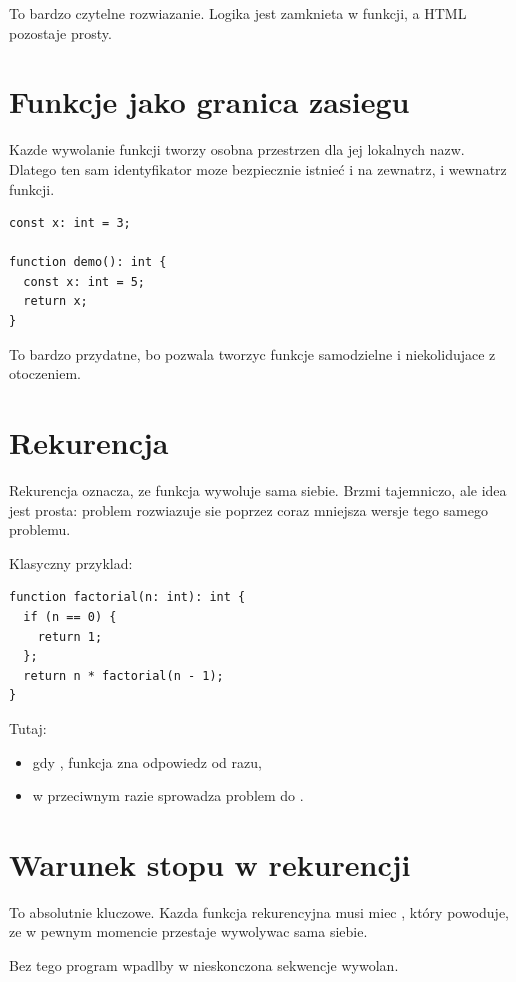 To bardzo czytelne rozwiazanie. Logika jest zamknieta w funkcji, a HTML pozostaje prosty.

\section{Funkcje jako granica zasiegu}
Kazde wywolanie funkcji tworzy osobna przestrzen dla jej lokalnych nazw. Dlatego ten sam
identyfikator moze bezpiecznie istnieć i na zewnatrz, i wewnatrz funkcji.

\begin{lstlisting}[style=moonchunk,caption={Ta sama nazwa poza i wewnatrz funkcji}]
const x: int = 3;

function demo(): int {
  const x: int = 5;
  return x;
}
\end{lstlisting}

To bardzo przydatne, bo pozwala tworzyc funkcje samodzielne i niekolidujace z otoczeniem.

\section{Rekurencja}
Rekurencja oznacza, ze funkcja wywoluje sama siebie. Brzmi tajemniczo, ale idea jest
prosta: problem rozwiazuje sie poprzez coraz mniejsza wersje tego samego problemu.

Klasyczny przyklad:

\begin{lstlisting}[style=moonchunk,caption={Rekurencyjna funkcja factorial}]
function factorial(n: int): int {
  if (n == 0) {
    return 1;
  };
  return n * factorial(n - 1);
}
\end{lstlisting}

Tutaj:

\begin{itemize}
  \item gdy , funkcja zna odpowiedz od razu,
  \item w przeciwnym razie sprowadza problem do .
\end{itemize}

\section{Warunek stopu w rekurencji}
To absolutnie kluczowe. Kazda funkcja rekurencyjna musi miec ,
który powoduje, ze w pewnym momencie przestaje wywolywac sama siebie.

Bez tego program wpadlby w nieskonczona sekwencje wywolan.

